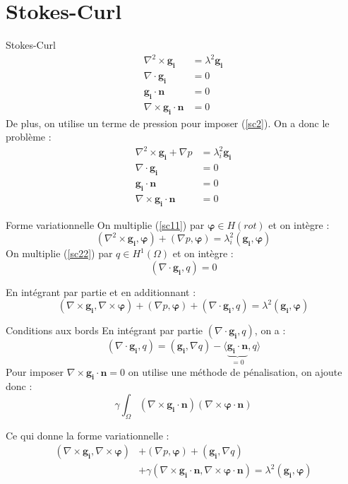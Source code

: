 \documentclass{beamer}
\newcommand{\grad}{{\nabla}}
\newcommand{\rot}{{\nabla\times}}
\newcommand{\rott}{{\nabla^2\times}}
\renewcommand{\div}{{\nabla\cdot}}
\begin{document}
\section{Stokes-Curl}
\begin{frame}{Stokes-Curl}
\begin{align}
\rott \bm{g_i} &= \lambda^2\bm{g_i}\label{sc1}\\
\div \bm{g_i} &= 0\label{sc2}\\
\bm{g_i}\cdot\bm{n}&=0\\
\rot\bm{g_i}\cdot\bm{n}&=0
\end{align}
De plus, on utilise un terme de pression pour imposer (\ref{sc2}). On a donc le problème :
\begin{align}
\rott \bm{g_i} + \grad p &= \lambda^2_i\bm{g_i}\label{sc11}\\
\div\bm{g_i} &= 0\label{sc22}\\
\bm{g_i}\cdot\bm{n}&=0\\
\rot\bm{g_i}\cdot\bm{n}&=0
\end{align}
\end{frame}

\begin{frame}{Forme variationnelle}
On multiplie (\ref{sc11}) par $\bm{\varphi}\in H(rot)$ et on intègre :
\[ (\rott\bm{g_i},\bm{\varphi})+(\grad p,\bm{\varphi}) = \lambda^2_i (\bm{g_i},\bm{\varphi}) \]
On multiplie (\ref{sc22}) par $q\in H^1(\Omega)$ et on intègre :
\[ (\div\bm{g_i},q) = 0 \]
\begin{block}{En intégrant par partie et en additionnant :}
\[ (\rot\bm{g_i},\rot\bm{\varphi}) + (\grad p, \bm{\varphi}) + (\div\bm{g_i},q) = \lambda^2(\bm{g_i},\bm{\varphi}) \]
\end{block}
\end{frame}

\begin{frame}{Conditions aux bords}
En intégrant par partie $(\div\bm{g_i},q)$, on a :
\[ (\div\bm{g_i},q) = (\bm{g_i},\grad q) - \langle \underbrace{\bm{g_i}\cdot \bm{n}}_{=0}, q \rangle \] 
Pour imposer $\rot\bm{g_i}\cdot\bm{n}=0$ on utilise une méthode de pénalisation, on ajoute donc :
\[ \gamma\int_\Omega (\rot\bm{g_i}\cdot\bm{n})(\rot\bm{\varphi}\cdot\bm{n}) \]
\begin{block}{Ce qui donne la forme variationnelle :}
\[\begin{aligned}
(\rot\bm{g_i},\rot\bm{\varphi}) &+ (\grad p, \bm{\varphi}) + (\bm{g_i}, \grad q)\\
&+ \gamma(\rot\bm{g_i}\cdot\bm{n},\rot\bm{\varphi}\cdot\bm{n}) = \lambda^2(\bm{g_i},\bm{\varphi})
\end{aligned}\]
\end{block}
\end{frame}
\end{document}
